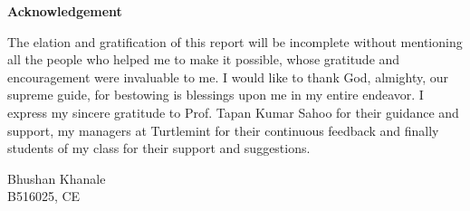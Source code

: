 \vspace{1in}
\centerline{\Large{\bf Acknowledgement}}
\vspace{.75cm}
\noindent The elation and gratification of this report will be incomplete
without mentioning all the people who helped me to make it possible, whose
gratitude and encouragement were invaluable to me. I would like to thank God,
almighty, our supreme guide, for bestowing is blessings upon me in my entire
endeavor. I express my sincere gratitude to Prof. Tapan Kumar Sahoo for
their guidance and support, my managers at Turtlemint for their continuous
feedback and finally students of my class for their support and suggestions.

\vspace*{0.5in}
\begin{flushright}
Bhushan Khanale\\
B516025, CE\\
\end{flushright}
